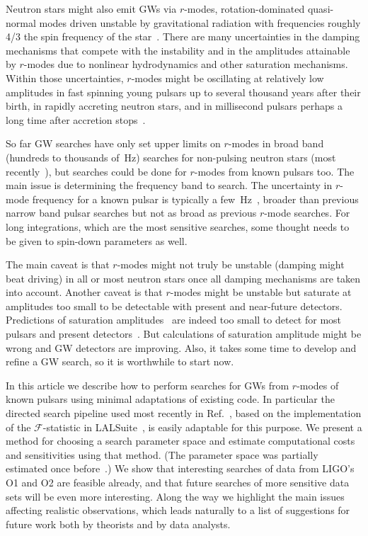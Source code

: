\documentclass{ttuthes2007}
\begin{document}
Neutron stars might also emit \acp{GW} via $r$-modes, rotation-dominated
quasi-normal modes driven unstable by gravitational radiation with frequencies
roughly 4/3 the spin frequency of the star~\cite[and references
therein]{Paschalidis:2016vmz}.
There are many uncertainties in the damping mechanisms that compete with the
instability and in the amplitudes attainable by $r$-modes due to nonlinear
hydrodynamics and other saturation mechanisms.
Within those uncertainties, $r$-modes might be oscillating at relatively low
amplitudes in fast spinning young pulsars up to several thousand years after
their birth, in rapidly accreting neutron stars, and in millisecond pulsars
perhaps a long time after accretion stops~\cite[and references
therein]{Glampedakis:2017nqy}.

So far \ac{GW} searches have only set upper limits on $r$-modes in broad band
(hundreds to thousands of~Hz) searches for non-pulsing neutron stars (most
recently~\cite{Abbott:2018qee}), but searches could be done for $r$-modes from
known pulsars too.
The main issue is determining the frequency band to search.
The uncertainty in $r$-mode frequency for a known pulsar is typically a
few~Hz~\cite{Idrisy:2014qca}, broader than previous narrow band pulsar
searches but not as broad as previous $r$-mode searches.
For long integrations, which are the most sensitive searches, some thought
needs to be given to spin-down parameters as well.

The main caveat is that $r$-modes might not truly be unstable (damping might
beat driving) in all or most neutron stars once all damping mechanisms are
taken into account.
Another caveat is that $r$-modes might be unstable but saturate at amplitudes
too small to be detectable with present and near-future detectors.
Predictions of saturation amplitudes~\cite{Arras:2002dw} are indeed too small
to detect for most pulsars and present detectors~\cite{Owen:2010ng}.
But calculations of saturation amplitude might be wrong and \ac{GW} detectors
are improving.
Also, it takes some time to develop and refine a \ac{GW} search, so it is
worthwhile to start now.

In this article we describe how to perform searches for \acp{GW} from
$r$-modes of known pulsars using minimal adaptations of existing code.
In particular the directed search pipeline used most recently in
Ref.~\cite{Abbott:2018qee}, based on the implementation of the
$\mathcal{F}$-statistic in LALSuite~\cite{LALSuite}, is easily adaptable for
this purpose.
We present a method for choosing a search parameter space and estimate
computational costs and sensitivities using that method.
(The parameter space was partially estimated once before~\cite{Ian}.)
We show that interesting searches of data from LIGO's \ac{O1} and \ac{O2} are
feasible already, and that future searches of more sensitive data sets will be
even more interesting.
Along the way we highlight the main issues affecting realistic observations,
which leads naturally to a list of suggestions for future work both by
theorists and by data analysts.
\end{document}
